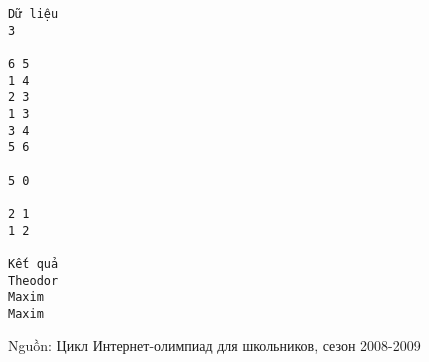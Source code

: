 \begin{verbatim}
Dữ liệu
3

6 5
1 4
2 3
1 3
3 4
5 6

5 0

2 1
1 2

Kết quả
Theodor
Maxim
Maxim 
\end{verbatim}

   Nguồn: Цикл Интернет-олимпиад для школьников, сезон 2008-2009